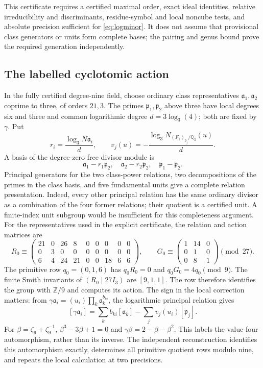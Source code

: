 \documentclass[11pt]{article}
\theoremstyle{remark}\newtheorem{remark}[theorem]{Remark}
\newcommand{\Z}{\mathbb Z}\newcommand{\Q}{\mathbb Q}\newcommand{\F}{\mathbb F}
\begin{document}
This certificate requires a certified maximal order, exact ideal identities, relative irreducibility and discriminants, residue-symbol and local noncube tests, and absolute precision sufficient for \eqref{eq:logminor}.
It does not assume that provisional class generators or units form complete bases; the pairing and genus bound prove the required generation independently.

\subsection{The labelled cyclotomic action}
In the fully certified degree-nine field, choose ordinary class representatives $\mathfrak a_1,\mathfrak a_2$ coprime to three, of orders $21,3$.
The primes $\mathfrak p_1,\mathfrak p_2$ above three have local degrees six and three and common logarithmic degree $d=3\log_3(4)$; both are fixed by $\gamma$.
Put
\[
 r_i=\frac{\log_3N\mathfrak a_i}{d},\qquad
 v_j(u)=-\frac{\log_3N_{(F_1)_{\mathfrak p_j}/\Q_3}(u)}{d}.
\]
A basis of the degree-zero free divisor module is
\[
 \mathfrak a_1-r_1\mathfrak p_2,\quad
 \mathfrak a_2-r_2\mathfrak p_2,\quad\mathfrak p_1-\mathfrak p_2.
\]
Principal generators for the two class-power relations, two decompositions of the primes in the class basis, and five fundamental units give a complete relation presentation.
Indeed, every other principal relation has the same ordinary divisor as a combination of the four former relations; their quotient is a certified unit.
A finite-index unit subgroup would be insufficient for this completeness argument.
For the representatives used in the explicit certificate, the relation and action matrices are
\begin{equation}
 R_0\equiv\begin{pmatrix}
 21&0&26&8&0&0&0&0&0\\
 0&3&0&0&0&0&0&0&0\\
 6&4&24&21&0&0&18&6&6
 \end{pmatrix},\qquad
 G_0\equiv\begin{pmatrix}1&14&0\\0&1&0\\0&8&1\end{pmatrix}\pmod{27}.
 \label{eq:matrices}
\end{equation}
The primitive row $q_0=(0,1,6)$ has $q_0R_0=0$ and $q_0G_0=4q_0\pmod9$.
The finite Smith invariants of $(R_0\mid27I_3)$ are $[9,1,1]$.
The row therefore identifies the group with $\Z/9$ and computes its action.
The sign in the local correction matters: from $\gamma\mathfrak a_i=(u_i)\prod_k\mathfrak a_k^{b_{ki}}$, the logarithmic principal relation gives
\[
 [\gamma\mathfrak a_i]=\sum_kb_{ki}[\mathfrak a_k]-\sum_jv_j(u_i)[\mathfrak p_j].
\]
For $\beta=\zeta_9+\zeta_9^{-1}$, $\beta^3-3\beta+1=0$ and $\gamma\beta=2-\beta-\beta^2$.
This labels the value-four automorphism, rather than its inverse.
The independent reconstruction identifies this automorphism exactly, determines all primitive quotient rows modulo nine, and repeats the local calculation at two precisions.
\end{document}
